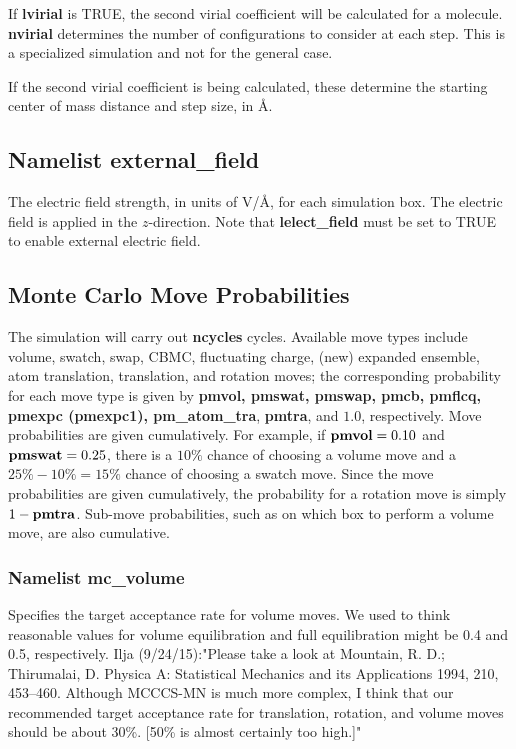 \documentclass[12pt,letterpaper]{article}
\begin{document}
 If {\bf lvirial} is TRUE, the second
virial coefficient will be calculated for a molecule. {\bf
  nvirial} determines the number of configurations to
consider at each step. This is a specialized simulation and
not for the general case.

 If the second virial
coefficient is being calculated, these determine the
starting center of mass distance and step size, in {\AA}.

\subsection{Namelist \textbf{external\_field}}
 The electric field strength, in
units of V/\AA, for each simulation box. The electric field
is applied in the $z$-direction. Note that {\bf
  lelect\_field} must be set to TRUE to enable external
electric field.

\subsection{Monte Carlo Move Probabilities}
The simulation will carry out {\bf ncycles} cycles.
Available move types include volume, swatch, swap, CBMC,
fluctuating charge, (new) expanded ensemble, atom
translation, translation, and rotation moves; the
corresponding probability for each move type is given by
{\bf pmvol, pmswat, pmswap, pmcb, pmflcq, pmexpc (pmexpc1),
  pm\_atom\_tra}, {\bf pmtra}, and $1.0$, respectively. Move
probabilities are given cumulatively. For example, if ${\bf
  pmvol} = 0.10$ and ${\bf pmswat} = 0.25$, there is a
$10\%$ chance of choosing a volume move and a $25\%-10\% =
15\%$ chance of choosing a swatch move. Since the move
probabilities are given cumulatively, the probability for a
rotation move is simply $1 - {\bf pmtra}$. Sub-move
probabilities, such as on which box to perform a volume
move, are also cumulative.

\subsubsection{Namelist \textbf{mc\_volume}}
 Specifies the target acceptance rate
for volume moves. We used to think reasonable values for volume equilibration
and full equilibration might be 0.4 and 0.5, respectively.
Ilja (9/24/15):"Please take a look at 
Mountain, R. D.; Thirumalai, D. Physica A: Statistical Mechanics and its Applications
1994, 210, 453–460.
Although MCCCS-MN is much more complex, I think that our
recommended target acceptance rate for translation, rotation,
and volume moves should be about 30\%.  [50\% is almost certainly too high.]"
\end{document}
